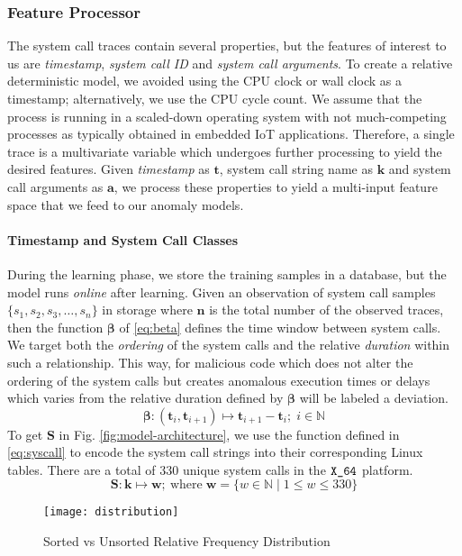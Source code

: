 \subsubsection{Feature Processor}
\label{subsubsec:preprocessing}
The system call traces contain several properties, but the features of interest 
to us are \emph{timestamp}, \emph{system call ID} and \emph{system call 
	arguments}. To create a relative deterministic model, we avoided using the 
	CPU 
clock or wall clock as a timestamp; alternatively, we use the CPU cycle count. 
We assume that the process is running in a scaled-down operating system with 
not much-competing processes as typically obtained in embedded IoT 
applications. 
Therefore, a single trace is a multivariate variable which undergoes further 
processing to yield the desired features. Given \emph{timestamp} 
as $\mathbf{t} $, system call string name as $ \mathbf{k} $ and system call 
arguments as $ \mathbf{a} $, we process these properties to yield a 
multi-input feature space that we feed to our anomaly models.
\paragraph{Timestamp and System Call Classes}
During the learning phase, we store the training samples in a database, but the 
model runs \emph{online} after learning. Given an observation of system call 
samples $ \lbrace s_1, s_2, 
s_3,\ldots,s_{n} \rbrace $ in storage where $ \bm{n} $ is the 
total number of the observed traces, then the function $ \bm{\beta} $ 
of \eqref{eq:beta} defines the time window between system calls. We target  
both the \emph{ordering} of the system calls and the relative 
\emph{duration} within such a relationship. This way, for malicious code which 
does 
not alter the ordering of the system calls but creates anomalous execution 
times or 
delays which varies from the relative duration defined by 
$\bm{\beta} $ will be labeled a deviation.
\begin{equation}
\bm{\beta}:\left(\bm{t}_i,\bm{t}_{i+1}\right) \longmapsto 
\bm{t}_{i+1} -\bm{t}_i; \; i \in \mathbb{N}  \label{eq:beta}
\end{equation}
To get $ \bm{S} $ in Fig. 
\ref{fig:model-architecture}, we 
use the function defined in \eqref{eq:syscall} to encode the system call strings
into their corresponding Linux tables. There are a total of $ 330 $ unique 
system calls in the $ \verb|X_64| $ platform.
\begin{equation}
\bm{S}: \bm{k} \longmapsto 
\bm{w}; \:
\text{where}\; \bm{w}=\lbrace \mathit{w} \in \mathbb{N} 
\mid 1 \leq \mathit{w} \leq 330 \rbrace 
\label{eq:syscall}
\end{equation}
\begin{figure}[!t]
	\centering
	\texttt{[image: distribution]} 
	\caption{Sorted vs Unsorted Relative Frequency Distribution}
	\label{fig:distribution}
\end{figure} 

